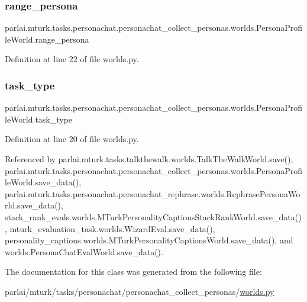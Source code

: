 \subsubsection{\texorpdfstring{range\+\_\+persona}{range\_persona}}
{\footnotesize\ttfamily parlai.\+mturk.\+tasks.\+personachat.\+personachat\+\_\+collect\+\_\+personas.\+worlds.\+Persona\+Profile\+World.\+range\+\_\+persona}



Definition at line 22 of file worlds.\+py.

\mbox{\label{classparlai_1_1mturk_1_1tasks_1_1personachat_1_1personachat__collect__personas_1_1worlds_1_1PersonaProfileWorld_a5d3fcb3260cb4234fead9654ab40f150}} 
\subsubsection{\texorpdfstring{task\+\_\+type}{task\_type}}
{\footnotesize\ttfamily parlai.\+mturk.\+tasks.\+personachat.\+personachat\+\_\+collect\+\_\+personas.\+worlds.\+Persona\+Profile\+World.\+task\+\_\+type}



Definition at line 20 of file worlds.\+py.



Referenced by parlai.\+mturk.\+tasks.\+talkthewalk.\+worlds.\+Talk\+The\+Walk\+World.\+save(), parlai.\+mturk.\+tasks.\+personachat.\+personachat\+\_\+collect\+\_\+personas.\+worlds.\+Persona\+Profile\+World.\+save\+\_\+data(), parlai.\+mturk.\+tasks.\+personachat.\+personachat\+\_\+rephrase.\+worlds.\+Rephrase\+Persona\+World.\+save\+\_\+data(), stack\+\_\+rank\+\_\+evals.\+worlds.\+M\+Turk\+Personality\+Captions\+Stack\+Rank\+World.\+save\+\_\+data(), mturk\+\_\+evaluation\+\_\+task.\+worlds.\+Wizard\+Eval.\+save\+\_\+data(), personality\+\_\+captions.\+worlds.\+M\+Turk\+Personality\+Captions\+World.\+save\+\_\+data(), and worlds.\+Persona\+Chat\+Eval\+World.\+save\+\_\+data().



The documentation for this class was generated from the following file\+:\begin{DoxyCompactItemize}
\item 
parlai/mturk/tasks/personachat/personachat\+\_\+collect\+\_\+personas/\hyperlink{parlai_2mturk_2tasks_2personachat_2personachat__collect__personas_2worlds_8py}{worlds.\+py}\end{DoxyCompactItemize}
